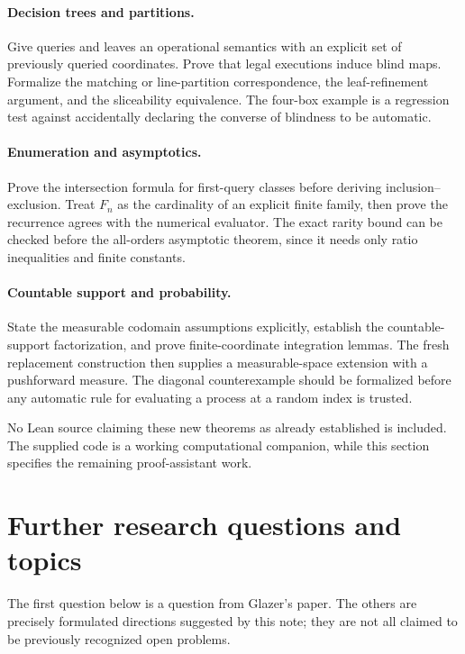 \documentclass[11pt,letterpaper]{article}
\theoremstyle{definition}
\begin{document}
\paragraph{Decision trees and partitions.}
Give queries and leaves an operational semantics with an explicit set of previously queried coordinates. Prove that legal executions induce blind maps. Formalize the matching or line-partition correspondence, the leaf-refinement argument, and the sliceability equivalence. The four-box example is a regression test against accidentally declaring the converse of blindness to be automatic.

\paragraph{Enumeration and asymptotics.}
Prove the intersection formula for first-query classes before deriving inclusion--exclusion. Treat $F_n$ as the cardinality of an explicit finite family, then prove the recurrence agrees with the numerical evaluator. The exact rarity bound can be checked before the all-orders asymptotic theorem, since it needs only ratio inequalities and finite constants.

\paragraph{Countable support and probability.}
State the measurable codomain assumptions explicitly, establish the countable-support factorization, and prove finite-coordinate integration lemmas. The fresh replacement construction then supplies a measurable-space extension with a pushforward measure. The diagonal counterexample should be formalized before any automatic rule for evaluating a process at a random index is trusted.

No Lean source claiming these new theorems as already established is included. The supplied code is a working computational companion, while this section specifies the remaining proof-assistant work.

\section{Further research questions and topics}
\label{mbg:sec:questions}

The first question below is a question from Glazer's paper. The others are precisely formulated directions suggested by this note; they are not all claimed to be previously recognized open problems.
\end{document}
